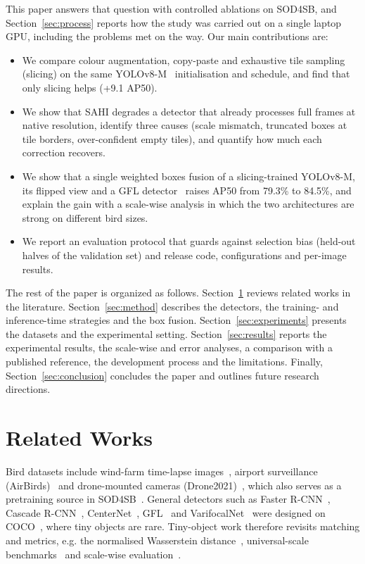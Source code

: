 \documentclass[5p,a4paper]{elsarticle}
\begin{document}
This paper answers that question with controlled ablations on SOD4SB, and Section~\ref{sec:process} reports how
the study was carried out on a single laptop GPU, including the problems met on the way. Our main contributions are:
\begin{itemize}
\item We compare colour augmentation, copy-paste and exhaustive tile sampling (slicing) on the same
YOLOv8-M~\cite{jocher2023yolov8} initialisation and schedule, and find that only slicing helps (+9.1 AP50).
\item We show that SAHI degrades a detector that already processes full frames at native resolution, identify
three causes (scale mismatch, truncated boxes at tile borders, over-confident empty tiles), and quantify how much
each correction recovers.
\item We show that a single weighted boxes fusion of a slicing-trained YOLOv8-M, its flipped view and a GFL
detector~\cite{li2020gfl} raises AP50 from 79.3\% to 84.5\%, and explain the gain with a scale-wise analysis in
which the two architectures are strong on different bird sizes.
\item We report an evaluation protocol that guards against selection bias (held-out halves of the validation
set) and release code, configurations and per-image results.
\end{itemize}

The rest of the paper is organized as follows. Section~\ref{sec:related} reviews related works in the literature.
Section~\ref{sec:method} describes the detectors, the training- and inference-time strategies and the box fusion.
Section~\ref{sec:experiments} presents the datasets and the experimental setting. Section~\ref{sec:results} reports the
experimental results, the scale-wise and error analyses, a comparison with a published reference, the development
process and the limitations. Finally, Section~\ref{sec:conclusion} concludes the paper and outlines future research
directions.

\section{Related Works}
\label{sec:related}
Bird datasets include wind-farm time-lapse images~\cite{yoshihashi2017windfarm}, airport surveillance
(AirBirds)~\cite{sun2022airbirds} and drone-mounted cameras (Drone2021)~\cite{fujii2021distant}, which also
serves as a pretraining source in SOD4SB~\cite{kondo2023sod4sb}. General detectors such as Faster
R-CNN~\cite{ren2015faster}, Cascade R-CNN~\cite{cai2018cascade}, CenterNet~\cite{zhou2019objects}, GFL~\cite{li2020gfl}
and VarifocalNet~\cite{zhang2021varifocalnet} were designed on COCO~\cite{lin2014coco}, where tiny objects are
rare. Tiny-object work therefore revisits matching and metrics, e.g. the normalised Wasserstein
distance~\cite{wang2021nwd}, universal-scale benchmarks~\cite{shinya2022usb} and scale-wise evaluation~\cite{shinya2023bandre}.
\end{document}
